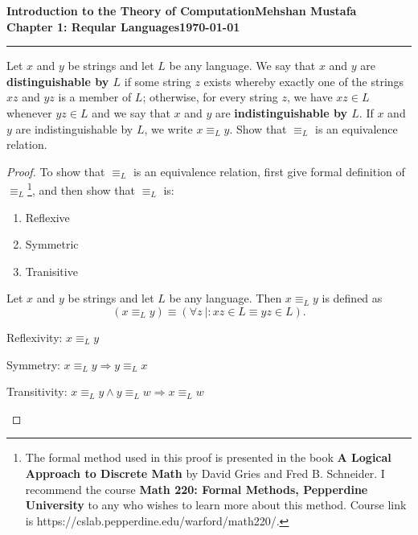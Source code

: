\documentclass[11pt]{article}
\newcommand{\myname}{Mehshan Mustafa}
\newcommand{\dated}{\today}
\newenvironment{theorem}[2][Theorem]{\begin{trivlist}
\item[\hskip \labelsep {\bfseries #1}\hskip \labelsep {\bfseries #2.}]}{\end{trivlist}}
\newenvironment{problem}[2][Problem]{\begin{trivlist}
\item[\hskip \labelsep {\bfseries #1}\hskip \labelsep {\bfseries #2.}]}{\end{trivlist}}
\begin{document}
\textbf{Introduction to the Theory of
Computation}\hfill\textbf{\myname}\\[0.01in]
\textbf{Chapter 1: Reqular Languages}\hfill\textbf{\dated}\\
\smallskip\hrule\bigskip

\begin{problem}{1.51}
Let $x$ and $y$ be strings and let $L$ be any language. We say that $x$ and $y$ are \textbf{distinguishable by $L$} if some string $z$ exists whereby exactly one of the strings $xz$ and $yz$ is a member of $L$; otherwise, for every string $z$, we have $xz \in L$ whenever $yz \in L$ and we say that $x$ and $y$ are \textbf{indistinguishable by $L$}. If $x$ and $y$ are indistinguishable by $L$, we write $x \equiv_{L} y$. Show that $\equiv_{L}$ is an equivalence relation.
\end{problem}

\begin{proof}
To show that $\equiv_{L}$ is an equivalence relation, first give formal definition of $\equiv_{L}$\footnote{The formal method used in this proof is presented in the book \textbf{A Logical Approach
to Discrete Math} by David Gries and Fred B. Schneider. I recommend the course \textbf{Math 220: Formal Methods, Pepperdine University} to any who wishes to learn more about this method. Course link is https://cslab.pepperdine.edu/warford/math220/.}, and then show that $\equiv_{L}$ is:
\begin{enumerate}
\item Reflexive
\item Symmetric
\item Tranisitive
\end{enumerate}
\begin{theorem}[Definition]{1} 
Let $x$ and $y$ be strings and let $L$ be any language. Then $x \equiv_{L} y$ is defined as
\[
(x \equiv_{L} y) \equiv (\forall z \ |: xz \in L \equiv yz \in L).
\]
\end{theorem}

\begin{problem}[Part]{1}
Reflexivity: $x \equiv_{L} y$
\end{problem}

\begin{problem}[Part]{2}
Symmetry: $x \equiv_{L} y \Rightarrow y \equiv_{L} x$
\end{problem}

\begin{problem}[Part]{3}
Transitivity: $x \equiv_{L} y \wedge y \equiv_{L} w \Rightarrow x \equiv_{L} w$
\end{problem}
\end{proof}
\end{document}
